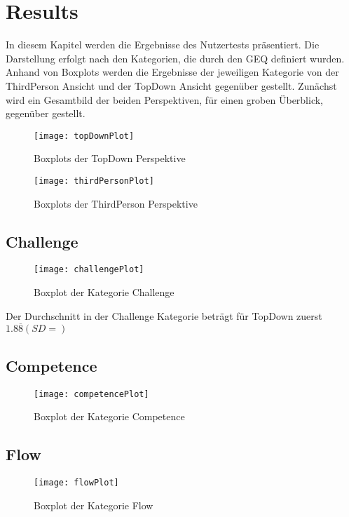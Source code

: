\chapter{Results} %
In diesem Kapitel werden die Ergebnisse des Nutzertests präsentiert. Die Darstellung erfolgt nach den Kategorien, die durch den GEQ definiert wurden. Anhand von Boxplots werden die Ergebnisse der jeweiligen Kategorie von der ThirdPerson Ansicht und der TopDown Ansicht gegenüber gestellt.
Zunächst wird ein Gesamtbild der beiden Perspektiven, für einen groben Überblick, gegenüber gestellt.
\begin{figure}[h!tb]
	\centering
	\texttt{[image: topDownPlot]}
	\caption{Boxplots der TopDown Perspektive\label{fig:topdownbox}}
\end{figure}
\begin{figure}[h!tb]
	\centering
	\texttt{[image: thirdPersonPlot]}
	\caption{Boxplots der ThirdPerson Perspektive\label{fig:thirdpersonbox}}
\end{figure}


\section{Challenge}
\begin{figure}[h!tb]
	\centering
	\texttt{[image: challengePlot]}
	\caption{Boxplot der Kategorie Challenge\label{fig:challengebox}}
\end{figure}
Der Durchschnitt in der Challenge Kategorie beträgt für TopDown zuerst $1.8\overline{8}(SD = )$ 
\section{Competence}
\begin{figure}[h!tb]
	\centering
	\texttt{[image: competencePlot]}
	\caption{Boxplot der Kategorie Competence\label{fig:competencebox}}
\end{figure}

\section{Flow}
\begin{figure}[h!tb]
	\centering
	\texttt{[image: flowPlot]}
	\caption{Boxplot der Kategorie Flow\label{fig:flowbox}}
\end{figure}

